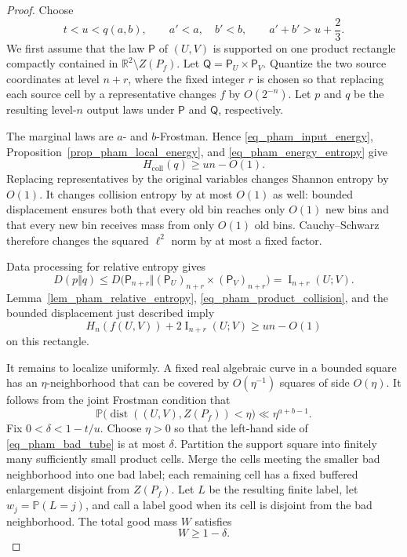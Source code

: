 \documentclass[11pt]{article}
\begin{document}
\begin{proof}
Choose
\[
 t<u<q(a,b),\qquad a'<a,\quad b'<b,
 \qquad a'+b'>u+\frac{2}{3}.
\]
We first assume that the law $\mathsf P$ of $(U,V)$ is supported on one
product rectangle compactly contained in
$\mathbb R^2\setminus Z(P_f)$.  Let
$\mathsf Q=\mathsf P_U\times\mathsf P_V$.  Quantize the
two source coordinates at level $n+r$, where the fixed integer $r$
is chosen so that replacing each source cell by a representative
changes $f$ by $O(2^{-n})$.  Let $p$ and $q$ be the resulting
level-$n$ output laws under $\mathsf P$ and $\mathsf Q$, respectively.

The marginal laws are $a$- and $b$-Frostman.  Hence
\eqref{eq_pham_input_energy},
Proposition~\ref{prop_pham_local_energy}, and
\eqref{eq_pham_energy_entropy} give
\begin{equation}
 H_{\mathrm{coll}}(q)\geq u n-O(1).
 \label{eq_pham_product_collision}
\end{equation}
Replacing representatives by the original variables changes Shannon
entropy by $O(1)$.  It changes collision entropy by at most $O(1)$ as
well: bounded displacement ensures both that every old bin reaches
only $O(1)$ new bins and that every new bin receives mass from only
$O(1)$ old bins.  Cauchy--Schwarz therefore changes the squared
$\ell^2$ norm by at most a fixed factor.

Data processing for relative entropy gives
\begin{equation}
 D(p\Vert q)
 \leq D\big(\mathsf P_{n+r}\Vert
       (\mathsf P_U)_{n+r}\times(\mathsf P_V)_{n+r}\big)
 =\operatorname{I}_{n+r}(U;V).
 \label{eq_pham_data_processing}
\end{equation}
Lemma~\ref{lem_pham_relative_entropy},
\eqref{eq_pham_product_collision}, and the bounded displacement just
described imply
\begin{equation}
 H_n(f(U,V))+2\operatorname{I}_{n+r}(U;V)
 \geq u n-O(1)
 \label{eq_pham_local_correlation}
\end{equation}
on this rectangle.

It remains to localize uniformly.  A fixed real algebraic curve in a
bounded square has an $\eta$-neighborhood that can be covered by
$O(\eta^{-1})$ squares of side $O(\eta)$.  It follows from the joint
Frostman condition that
\begin{equation}
 \mathbb P\big(\operatorname{dist}((U,V),Z(P_f))<\eta\big)
 \ll \eta^{a+b-1}.
 \label{eq_pham_bad_tube}
\end{equation}
Fix $0<\delta<1-t/u$.  Choose $\eta>0$ so that the left-hand side of
\eqref{eq_pham_bad_tube} is at most $\delta$.  Partition the support
square into finitely many sufficiently small product cells.  Merge
the cells meeting the smaller bad neighborhood into one bad label;
each remaining cell has a fixed buffered enlargement disjoint from
$Z(P_f)$.  Let $L$ be the resulting finite label, let
$w_j=\mathbb P(L=j)$,
and call a label good when its cell is disjoint from the bad
neighborhood.  The total good mass $W$ satisfies
\begin{equation}
 W\geq1-\delta.
 \label{eq_pham_good_mass}
\end{equation}


\end{proof}
\end{document}

